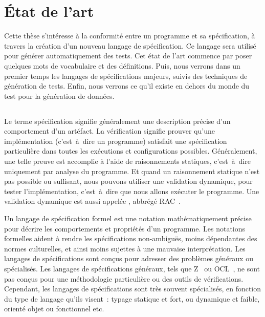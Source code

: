 \chapter{État de l'art}
\label{chapter:state}

\minitoc

Cette thèse s'intéresse à la conformité entre un programme et sa spécification,
à travers la création d'un nouveau langage de spécification. Ce langage sera
utilisé pour générer automatiquement des tests. Cet état de l'art commence par
poser quelques mots de vocabulaire et des définitions. Puis, nous verrons dans
un premier temps les langages de spécifications majeurs, suivis des techniques
de génération de tests. Enfin, nous verrons ce qu'il existe en dehors du monde
du test pour la génération de données.

\section{}
\label{section:sota:bisl}

Le terme {\strong spécification} signifie généralement une description précise
d'un comportement d'un artéfact. La {\strong vérification} signifie prouver
qu'une implémentation (c'est~à~dire un programme) satisfait une spécification
particulière dans toutes les exécutions et configurations possibles.
Généralement, une telle preuve est accomplie à l'aide de raisonnements
statiques, c'est~à~dire uniquement par analyse du programme. Et quand un
raisonnement statique n'est pas possible ou suffisant, nous pouvons utiliser une
{\strong validation} dynamique, pour tester l'implémentation, c'est~à~dire que
nous allons exécuter le programme. Une validation dynamique est aussi appelée
, abbrégé RAC~.

Un {\strong langage de spécification} formel est une notation mathématiquement
précise pour décrire les comportements et propriétés d'un programme. Les
{\strong notations formelles} aident à rendre les spécifications non-ambiguës,
moins dépendantes des normes culturelles, et ainsi moins sujettes à une mauvaise
interprétation. Les langages de spécifications sont conçus pour adresser des
problèmes généraux ou spécialisés. Les langages de spécifications généraux, tels
que Z~ ou OCL~, ne sont pas conçus pour une
méthodologie particulière ou des outils de vérifications. Cependant, les
langages de spécifications sont très souvent spécialisés, en fonction du type de
langage qu'ils visent~: typage statique et fort, ou dynamique et faible, orienté
objet ou fonctionnel etc.

